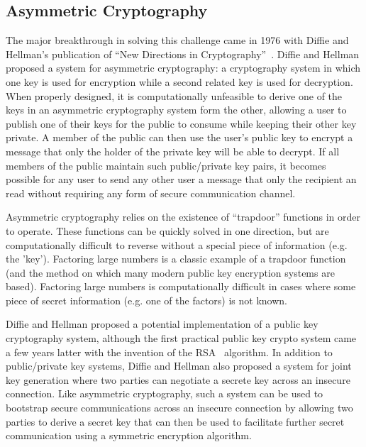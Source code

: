 \subsection{Asymmetric Cryptography}

The major breakthrough in solving this challenge came in 1976 with
Diffie and Hellman's publication of ``New Directions in
Cryptography''~\cite{Diffie1976}. Diffie and Hellman proposed a system
for asymmetric cryptography: a cryptography system in which one key is
used for encryption while a second related key is used for
decryption. When properly designed, it is computationally unfeasible
to derive one of the keys in an asymmetric cryptography system form
the other, allowing a user to publish one of their keys for the public
to consume while keeping their other key private. A member of the
public can then use the user's public key to encrypt a message that
only the holder of the private key will be able to decrypt. If all
members of the public maintain such public/private key pairs, it
becomes possible for any user to send any other user a message that
only the recipient an read without requiring any form of secure
communication channel.

Asymmetric cryptography relies on the existence of ``trapdoor''
functions in order to operate. These functions can be quickly solved
in one direction, but are computationally difficult to reverse without
a special piece of information (e.g. the 'key'). Factoring large
numbers is a classic example of a trapdoor function (and the method on
which many modern public key encryption systems are based). Factoring
large numbers is computationally difficult in cases where some piece
of secret information (e.g. one of the factors) is not known.

Diffie and Hellman proposed a potential implementation of a public key
cryptography system, although the first practical public key crypto
system came a few years latter with the invention of the
RSA~\cite{Rivest1978} algorithm. In addition to public/private key
systems, Diffie and Hellman also proposed a system for joint key
generation where two parties can negotiate a secrete key across an
insecure connection. Like asymmetric cryptography, such a system can
be used to bootstrap secure communications across an insecure
connection by allowing two parties to derive a secret key that can
then be used to facilitate further secret communication using a
symmetric encryption algorithm.

